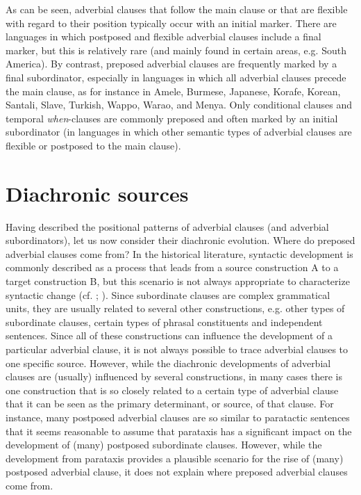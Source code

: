 \documentclass[output=paper]{langsci/langscibook}
\begin{document}
As can be seen, adverbial clauses that follow the main clause or that are flexible with regard to their position typically occur with an initial marker. There are languages in which postposed and flexible adverbial clauses include a final marker, but this is relatively rare (and mainly found in certain areas, e.g. South America). By contrast, preposed adverbial clauses are frequently marked by a final subordinator, especially in languages in which all adverbial clauses precede the main clause, as for instance in Amele, Burmese, Japanese, Korafe, Korean, Santali, Slave, Turkish, Wappo, Warao, and Menya. Only conditional clauses and temporal \textit{when}-clauses are commonly preposed and often marked by an initial subordinator (in languages in which other semantic types of adverbial clauses are flexible or postposed to the main clause). 

\section{Diachronic sources}\label{sec:diessel:3}

Having described the positional patterns of adverbial clauses (and adverbial subordinators), let us now consider their diachronic evolution. Where do preposed adverbial clauses come from? In the historical literature, syntactic development is commonly described as a process that leads from a source construction A to a target construction B, but this scenario is not always appropriate to characterize syntactic change (cf. \citealt{Givón1991};  \citealt{VandeVeldeEtAl2013}). Since subordinate clauses are complex grammatical units, they are usually related to several other constructions, e.g. other types of subordinate clauses, certain types of phrasal constituents and independent sentences. Since all of these constructions can influence the development of a particular adverbial clause, it is not always possible to trace adverbial clauses to one specific source. However, while the diachronic developments of adverbial clauses are (usually) influenced by several constructions, in many cases there is one construction that is so closely related to a certain type of adverbial clause that it can be seen as the primary determinant, or source, of that clause. For instance, many postposed adverbial clauses are so similar to paratactic sentences that it seems reasonable to assume that parataxis has a significant impact on the development of (many) postposed subordinate clauses. However, while the development from parataxis provides a plausible scenario for the rise of (many) postposed adverbial clause, it does not explain where preposed adverbial clauses come from.
\end{document}
